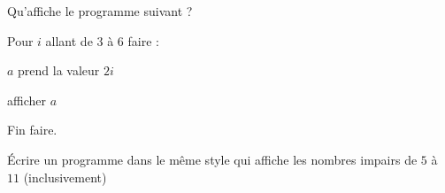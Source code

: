 
\begin{exercice}\label{exosmath-0527}

    Qu'affiche le programme suivant ?


\begin{fmpage}{0.9\linewidth}

    Pour \( i\) allant de \( 3\) à \( 6\) faire :

    \hspace{1cm} \( a\) prend la valeur \( 2i\)

    \hspace{1cm} afficher \( a\)

    Fin faire.

\end{fmpage}


    Écrire un programme dans le même style qui affiche les nombres impairs de \( 5\) à \( 11\) (inclusivement)



\end{exercice}
